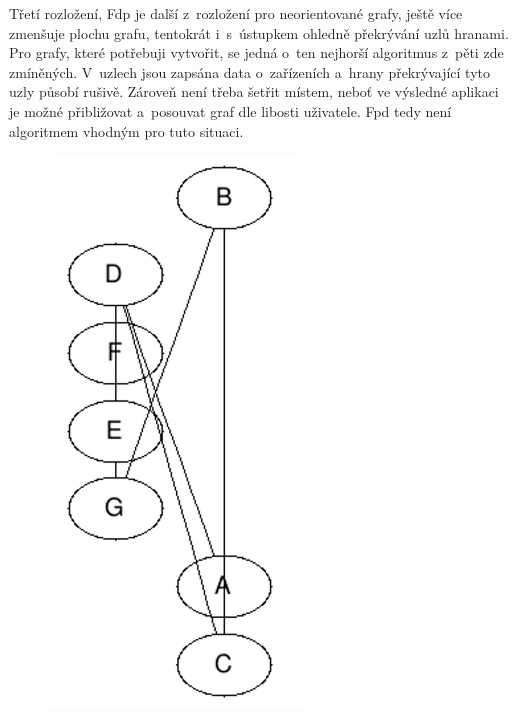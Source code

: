 \documentclass[color,table,oneside,nolot,nolof]{fithesis}
\begin{document}
	Třetí rozložení, \cite{graphviz_layout} 
	Fdp je další z~rozložení pro neorientované grafy, ještě více zmenšuje plochu grafu, tentokrát i~s~ústupkem ohledně překrývání
	uzlů hranami. Pro grafy, které potřebuji vytvořit, se jedná o~ten nejhorší algoritmus z~pěti zde zmíněných. V~uzlech jsou zapsána data o~zařízeních a~hrany překrývající tyto uzly
	působí rušivě. Zároveň není třeba šetřit místem, neboť ve výsledné aplikaci je možné přibližovat a~posouvat graf dle libosti uživatele. Fpd tedy není algoritmem vhodným pro tuto
	situaci.
\begin{figure}
	\centering
	\includegraphics[width=0.6\textwidth]{pictures/fdp_example.png} 
\end{figure}
\end{document}
